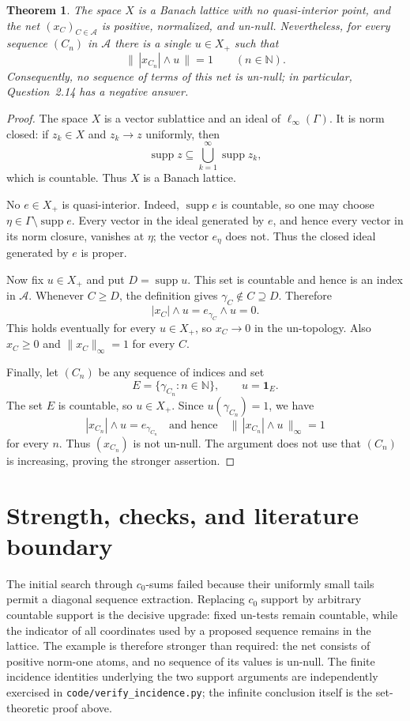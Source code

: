 \documentclass[11pt,a4paper]{article}
\newtheorem{theorem}{Theorem}
\newcommand{\N}{\mathbb N}
\newcommand{\one}{\mathbf 1}
\newcommand{\supp}{\operatorname{supp}}
\begin{document}
\begin{theorem}\label{thm:main}
The space $X$ is a Banach lattice with no quasi-interior point, and the net
$(x_C)_{C\in\mathcal A}$ is positive, normalized, and un-null.  Nevertheless,
for every sequence $(C_n)$ in $\mathcal A$ there is a single $u\in X_+$ such
that
\[
  \bigl\|\,|x_{C_n}|\wedge u\,\bigr\|=1
  \qquad(n\in\N).
\]
Consequently, no sequence of terms of this net is un-null; in particular,
Question~2.14 has a negative answer.
\end{theorem}

\begin{proof}
The space $X$ is a vector sublattice and an ideal of $\ell_\infty(\Gamma)$.
It is norm closed: if $z_k\in X$ and $z_k\to z$ uniformly, then
\[
  \supp z\subseteq\bigcup_{k=1}^\infty\supp z_k,
\]
which is countable.  Thus $X$ is a Banach lattice.

No $e\in X_+$ is quasi-interior.  Indeed, $\supp e$ is countable, so one may
choose $\eta\in\Gamma\setminus\supp e$.  Every vector in the ideal generated
by $e$, and hence every vector in its norm closure, vanishes at $\eta$;
the vector $e_\eta$ does not.  Thus the closed ideal generated by $e$ is
proper.

Now fix $u\in X_+$ and put $D=\supp u$.  This set is countable and hence is
an index in $\mathcal A$.  Whenever $C\geq D$, the definition gives
$\gamma_C\notin C\supseteq D$.  Therefore
\[
  |x_C|\wedge u=e_{\gamma_C}\wedge u=0.
\]
This holds eventually for every $u\in X_+$, so $x_C\to0$ in the un-topology.
Also $x_C\geq0$ and $\|x_C\|_\infty=1$ for every $C$.

Finally, let $(C_n)$ be any sequence of indices and set
\[
  E=\{\gamma_{C_n}:n\in\N\},\qquad u=\one_E.
\]
The set $E$ is countable, so $u\in X_+$.  Since
$u(\gamma_{C_n})=1$, we have
\[
  |x_{C_n}|\wedge u=e_{\gamma_{C_n}}
  \quad\text{and hence}\quad
  \bigl\|\,|x_{C_n}|\wedge u\,\bigr\|_\infty=1
\]
for every $n$.  Thus $(x_{C_n})$ is not un-null.  The argument does not use
that $(C_n)$ is increasing, proving the stronger assertion.
\end{proof}

\section{Strength, checks, and literature boundary}

The initial search through $c_0$-sums failed because their uniformly small
tails permit a diagonal sequence extraction.  Replacing $c_0$ support by
arbitrary countable support is the decisive upgrade: fixed un-tests remain
countable, while the indicator of all coordinates used by a proposed
sequence remains in the lattice.  The example is therefore stronger than
required: the net consists of positive norm-one atoms, and no sequence of
its values is un-null.  The finite incidence identities underlying the two
support arguments are independently exercised in
\texttt{code/verify\_incidence.py}; the infinite conclusion itself is the
set-theoretic proof above.
\end{document}

